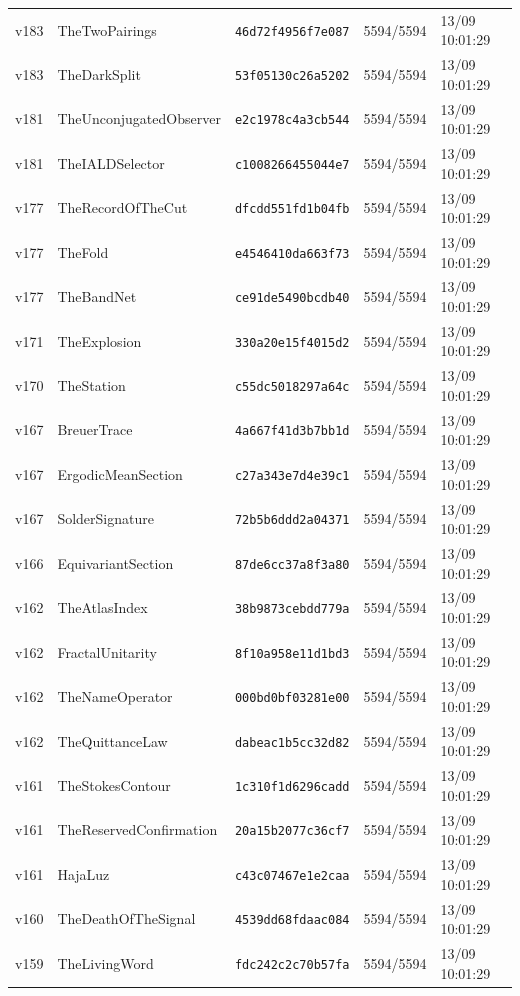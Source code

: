 \documentclass[11pt]{article}
\theoremstyle{definition}\newtheorem{deriv}{Derivação}
\begin{document}
{\begin{longtable}{@{}lllll@{}}
v183 & TheTwoPairings & \texttt{46d72f4956f7e087} & 5594/5594 & 13/09 10:01:29 \\
v183 & TheDarkSplit & \texttt{53f05130c26a5202} & 5594/5594 & 13/09 10:01:29 \\
v181 & TheUnconjugatedObserver & \texttt{e2c1978c4a3cb544} & 5594/5594 & 13/09 10:01:29 \\
v181 & TheIALDSelector & \texttt{c1008266455044e7} & 5594/5594 & 13/09 10:01:29 \\
v177 & TheRecordOfTheCut & \texttt{dfcdd551fd1b04fb} & 5594/5594 & 13/09 10:01:29 \\
v177 & TheFold & \texttt{e4546410da663f73} & 5594/5594 & 13/09 10:01:29 \\
v177 & TheBandNet & \texttt{ce91de5490bcdb40} & 5594/5594 & 13/09 10:01:29 \\
v171 & TheExplosion & \texttt{330a20e15f4015d2} & 5594/5594 & 13/09 10:01:29 \\
v170 & TheStation & \texttt{c55dc5018297a64c} & 5594/5594 & 13/09 10:01:29 \\
v167 & BreuerTrace & \texttt{4a667f41d3b7bb1d} & 5594/5594 & 13/09 10:01:29 \\
v167 & ErgodicMeanSection & \texttt{c27a343e7d4e39c1} & 5594/5594 & 13/09 10:01:29 \\
v167 & SolderSignature & \texttt{72b5b6ddd2a04371} & 5594/5594 & 13/09 10:01:29 \\
v166 & EquivariantSection & \texttt{87de6cc37a8f3a80} & 5594/5594 & 13/09 10:01:29 \\
v162 & TheAtlasIndex & \texttt{38b9873cebdd779a} & 5594/5594 & 13/09 10:01:29 \\
v162 & FractalUnitarity & \texttt{8f10a958e11d1bd3} & 5594/5594 & 13/09 10:01:29 \\
v162 & TheNameOperator & \texttt{000bd0bf03281e00} & 5594/5594 & 13/09 10:01:29 \\
v162 & TheQuittanceLaw & \texttt{dabeac1b5cc32d82} & 5594/5594 & 13/09 10:01:29 \\
v161 & TheStokesContour & \texttt{1c310f1d6296cadd} & 5594/5594 & 13/09 10:01:29 \\
v161 & TheReservedConfirmation & \texttt{20a15b2077c36cf7} & 5594/5594 & 13/09 10:01:29 \\
v161 & HajaLuz & \texttt{c43c07467e1e2caa} & 5594/5594 & 13/09 10:01:29 \\
v160 & TheDeathOfTheSignal & \texttt{4539dd68fdaac084} & 5594/5594 & 13/09 10:01:29 \\
v159 & TheLivingWord & \texttt{fdc242c2c70b57fa} & 5594/5594 & 13/09 10:01:29 \\

\end{longtable}}
\end{document}
